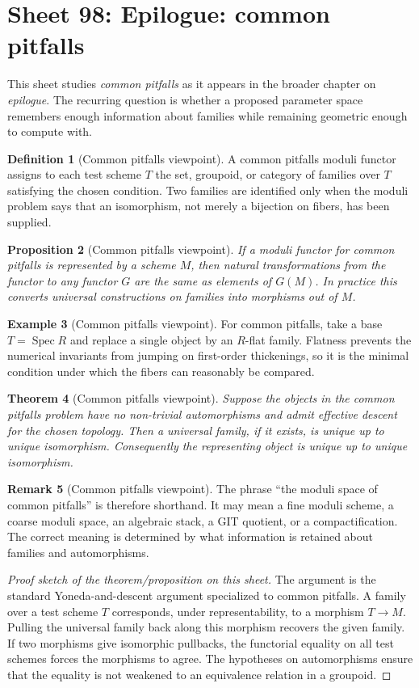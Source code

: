 \documentclass[11pt]{amsart}
\newtheorem{theorem}{Theorem}[section]
\newtheorem{proposition}[theorem]{Proposition}
\theoremstyle{definition}
\newtheorem{definition}[theorem]{Definition}
\newtheorem{example}[theorem]{Example}
\newtheorem{remark}[theorem]{Remark}
\newcommand{\Spec}{\operatorname{Spec}}
\begin{document}
\section{Sheet 98: Epilogue: common pitfalls}
This sheet studies \emph{common pitfalls} as it appears in the broader chapter on \emph{epilogue}.  The recurring question is whether a proposed parameter space remembers enough information about families while remaining geometric enough to compute with.
\begin{definition}[Common pitfalls viewpoint]
A common pitfalls moduli functor assigns to each test scheme $T$ the set, groupoid, or category of families over $T$ satisfying the chosen condition.  Two families are identified only when the moduli problem says that an isomorphism, not merely a bijection on fibers, has been supplied.
\end{definition}
\begin{proposition}[Common pitfalls viewpoint]
If a moduli functor for common pitfalls is represented by a scheme $M$, then natural transformations from the functor to any functor $G$ are the same as elements of $G(M)$.  In practice this converts universal constructions on families into morphisms out of $M$.
\end{proposition}
\begin{example}[Common pitfalls viewpoint]
For common pitfalls, take a base $T=\Spec R$ and replace a single object by an $R$-flat family.  Flatness prevents the numerical invariants from jumping on first-order thickenings, so it is the minimal condition under which the fibers can reasonably be compared.
\end{example}
\begin{theorem}[Common pitfalls viewpoint]
Suppose the objects in the common pitfalls problem have no non-trivial automorphisms and admit effective descent for the chosen topology.  Then a universal family, if it exists, is unique up to unique isomorphism.  Consequently the representing object is unique up to unique isomorphism.
\end{theorem}
\begin{remark}[Common pitfalls viewpoint]
The phrase ``the moduli space of common pitfalls'' is therefore shorthand.  It may mean a fine moduli scheme, a coarse moduli space, an algebraic stack, a GIT quotient, or a compactification.  The correct meaning is determined by what information is retained about families and automorphisms.
\end{remark}
\begin{proof}[Proof sketch of the theorem/proposition on this sheet]
The argument is the standard Yoneda-and-descent argument specialized to common pitfalls.  A family over a test scheme $T$ corresponds, under representability, to a morphism $T\to M$.  Pulling the universal family back along this morphism recovers the given family.  If two morphisms give isomorphic pullbacks, the functorial equality on all test schemes forces the morphisms to agree.  The hypotheses on automorphisms ensure that the equality is not weakened to an equivalence relation in a groupoid.
\end{proof}
\end{document}
